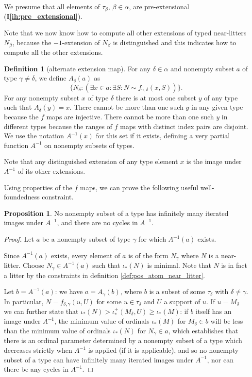 \documentclass{article}
\theoremstyle{definition}
\newtheorem{proposition}[theorem]{Proposition}
\newtheorem{definition}[theorem]{Definition}
\theoremstyle{remark}
\newcommand{\ihref}[1]{(\textbf{I\ref{#1}})}
\begin{document}
We presume that all elements of $\tau_\beta$, $\beta\in \alpha$, are pre-extensional \ihref{ih:pre_extensional}.

Note that we now know how to compute all other extensions of typed near-litters $N_\beta$, because the $-1$-extension of $N_\beta$ is distinguished and this indicates how to compute all the other extensions.

\begin{definition}[alternate extension map]\label{def:a_map}
For any $\delta \in \alpha$ and nonempty subset $a$ of type $\gamma \neq \delta$, we define $A_\delta(a)$ as
$$\{N_\delta:(\exists x \in a:\exists S:N \sim f_{\gamma,\delta}(x,S))\}.$$
For any nonempty subset $x$ of type $\delta$ there is at most one subset $y$ of any type such that $A_\delta(y)=x$.  There cannot be more than one such $y$ in any given type because the $f$ maps are injective.  There cannot be more than one such $y$ in different types because the ranges of $f$ maps with distinct index pairs are disjoint.   We use the notation $A^{-1}(x)$ for this set if it exists, defining a very partial function $A^{-1}$ on nonempty subsets of types.
\end{definition}

Note that any distinguished extension of any type element $x$ is the image under $A^{-1}$ of its other extensions.

{
Using properties of the $f$ maps, we can prove the following useful well-foundedness constraint.
}

\begin{proposition}\label{prop:a_map_well_founded}
No {nonempty} subset of a type has infinitely many iterated images under $A^{-1}$, and there are no cycles in $A^{-1}$.
\end{proposition}
\begin{proof}
Let $a$ be a {nonempty} subset of type $\gamma$ for which $A^{-1}(a)$ exists.

Since $A^{-1}(a)$ exists, every element of $a$ is of the form $N_\gamma$ where $N$ is a near-litter.  Choose $N_\gamma \in A^{-1}(a)$ such that $\iota_*(N)$ is minimal.  Note that $N$ is in fact a litter {by the constraints in definition \ref{def:pos_atom_near_litter}}.

Let $b = A^{-1}(a)$:  we have $a = A_\gamma(b)$, where $b$ is a subset of some $\tau_\delta$ with $\delta \neq \gamma$.  In particular, $N = f_{\delta,\gamma}(u,U)$ for
some $u \in \tau_\delta$ and $U$ a support of $u$.  If $u=M_\delta$ we can further state that $\iota_*(N) > \iota^+_*(M_\delta,U) \geq \iota_*(M)$:  if $b$ itself has an image under $A^{-1}$, the minimum value of ordinals $\iota_*(M)$ for $M_\delta \in b$ will be less than the minimum value of ordinals $\iota_*(N)$ for $N_\gamma\in a$, which establishes that there is an ordinal parameter determined by a nonempty subset of a type which decreases strictly when $A^{-1}$ is applied (if it is applicable), and so no nonempty subset of a type
can have infinitely many iterated images under $A^{-1}$, nor can there be any cycles in $A^{-1}$.  %
\end{proof}
\end{document}
